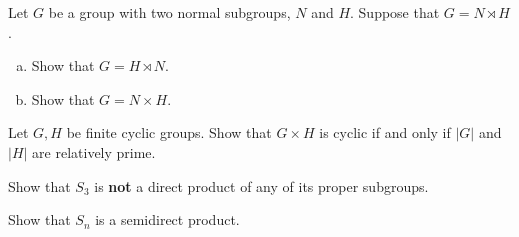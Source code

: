 \documentclass{problemset}
\begin{document}
\begin{exercise} Let \(G\) be a group with two normal subgroups, \(N\) and \(H\).  Suppose that \(G = N \rtimes H\).
\begin{enumerate}[(a)]
\item Show that \(G = H \rtimes N\). 
\item Show that \(G = N \times H\).
\end{enumerate}
\end{exercise}


\begin{exercise} Let \(G, H\) be finite cyclic groups.  Show that \(G \times H\) is cyclic if and only if \(|G|\) and \(|H|\) are relatively prime.
\end{exercise}


\begin{exercise} Show that \(S_3\) is \textbf{not} a direct product of any of its proper subgroups.
\end{exercise}


\begin{exercise} Show that \(S_n\) is a semidirect product.
\end{exercise}



\begin{exercise} 
\end{exercise}



\begin{exercise} 
\end{exercise}



\end{document}
